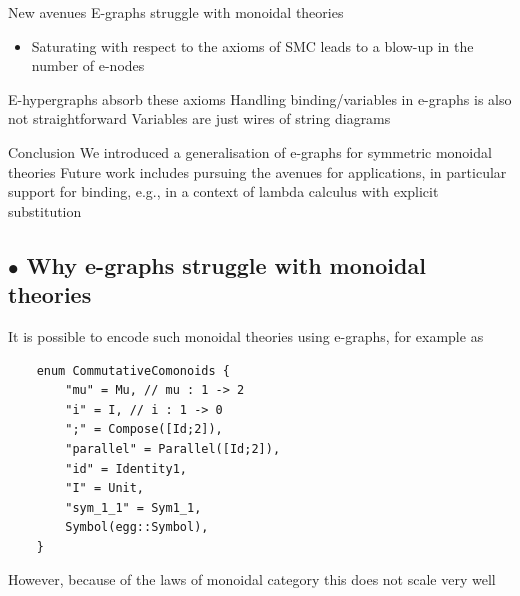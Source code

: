 \documentclass[aspectratio=169]{beamer}
\newcommand{\bsubsection}[1]{\subsection{$\bullet$ #1}}
\begin{document}
\begin{frame}{New avenues}
\vfill
E-graphs struggle with monoidal theories
\begin{itemize}
\item Saturating with respect to the axioms of SMC leads to a blow-up in the number of e-nodes
\end{itemize}
\vfill
E-hypergraphs absorb these axioms 
\vfill
Handling binding/variables in e-graphs is also not straightforward 
\vfill
Variables are just wires of string diagrams
\vfill
\end{frame}

\begin{frame}{Conclusion}
We introduced a generalisation of e-graphs for symmetric monoidal theories
\vfill
Future work includes pursuing the avenues for applications, in particular support for binding, e.g., in a context of lambda calculus with explicit substitution
\end{frame}

\appendix
\bsubsection{Why e-graphs struggle with monoidal theories}

\begin{frame}[containsverbatim]{}

It is possible to encode such monoidal theories using e-graphs, for example as

\begin{verbatim}
    enum CommutativeComonoids {
        "mu" = Mu, // mu : 1 -> 2
        "i" = I, // i : 1 -> 0
        ";" = Compose([Id;2]),
        "parallel" = Parallel([Id;2]),
        "id" = Identity1,
        "I" = Unit,
        "sym_1_1" = Sym1_1,
        Symbol(egg::Symbol),
    }
\end{verbatim}

\end{frame}

\begin{frame}
    However, because of the laws of monoidal category this does not scale very well
\end{frame}
\end{document}
